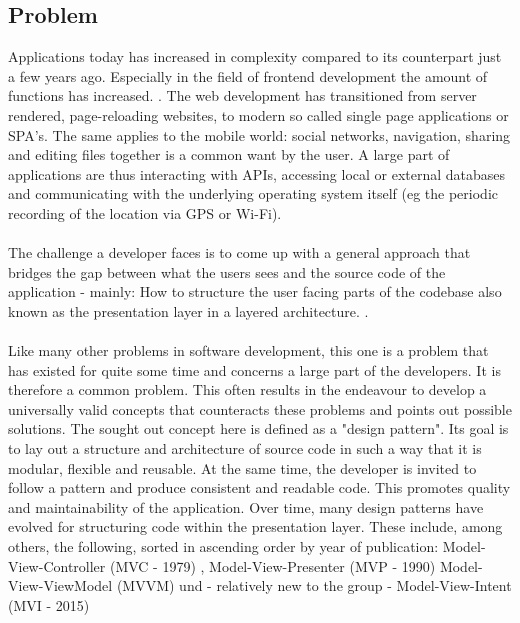 \subsection{Problem}
\label{subsec:problem}

Applications today has increased in complexity compared to its counterpart just a few years ago. Especially in the field of frontend development the amount of 
functions has increased.
\cite{kevin2018}. 
The web development has transitioned from server rendered, 
page-reloading websites, to modern so called single page applications or SPA's.
The same applies to the mobile world: social networks, navigation, sharing and editing files together is a common want by the user.
A large part of applications are thus interacting with APIs, accessing local or external databases
and communicating with the underlying operating system itself (eg the periodic recording of the location via GPS or Wi-Fi).
\\
\\
The challenge a developer faces is to come up with a general approach that bridges the gap between what the users sees and the source code of 
the application - mainly: How to structure the user facing parts of the codebase also known as the presentation layer in a layered architecture.
\cite{guru99ntier,softwareArchitecturePatternsMark2015}.
\\
\\
Like many other problems in software development, this one is a problem that has existed for quite some time and concerns a large part of the developers.
It is therefore a common problem. This often results in the endeavour to develop a universally valid concepts that counteracts these problems and points out 
possible solutions. The sought out concept here is defined as a "design pattern".
\cite{techterms2016design-pattern}
Its goal is to lay out a structure and architecture of source code in such a way that it is modular, flexible and
reusable. At the same time, the developer is invited to follow a pattern and produce consistent and readable code. This promotes quality and
maintainability of the application. Over time, many design patterns have evolved for structuring code within the presentation layer. 
These include, among others, the following, sorted in ascending order by year of publication: Model-View-Controller (MVC - 1979) 
\cite{wikipediaMvc}, 
Model-View-Presenter (MVP - 1990) 
\cite{wikipediaMvp} 
Model-View-ViewModel (MVVM) 
\cite{blogMsdnMvvm} und - relatively
new to the group - Model-View-Intent (MVI - 2015) 
